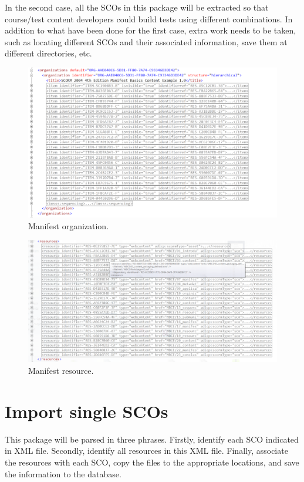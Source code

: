 In the second case, all the SCOs in this package will be extracted so that course/test content developers could build tests using different 
combinations. In addition to what have been done for the first case, extra work needs to be taken, such as locating different SCOs and their 
associated information, save them at different directories, etc.
\begin{figure}[t]
	\begin{center}
		\includegraphics[scale=0.3]{manifest_organization.png}
	\end{center}
	\caption{Manifest organization.}
	\label{fig:organization}
\end{figure}
\begin{figure}[t]
	\begin{center}
		\includegraphics[scale=0.3]{manifest_resource.png}
	\end{center}
	\caption{Manifest resource.}
	\label{fig:resource}
\end{figure}
\section{Import single SCOs}
This package will be parsed in three phrases. Firstly, identify each SCO indicated in XML file. Secondly, identify all resources in this XML file. 
Finally, associate the resources with each SCO, copy the files to the appropriate locations, and save the information to the database.


